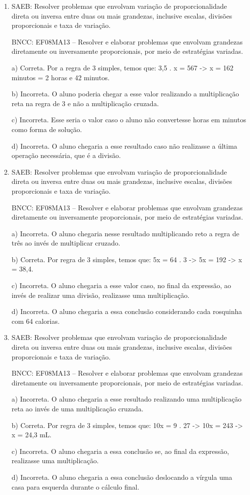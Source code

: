 \begin{enumerate}
\item SAEB: Resolver problemas que envolvam variação de proporcionalidade
direta ou inversa entre duas ou mais grandezas, inclusive escalas,
divisões proporcionais e taxa de variação.

BNCC: EF08MA13 -- Resolver e elaborar problemas que envolvam grandezas
diretamente ou inversamente proporcionais, por meio de estratégias
variadas.

a) Correta. Por a regra de 3 simples, temos que:
3,5 . x = 567 -> x = 162 minutos = 2 horas e 42 minutos.

b) Incorreta. O aluno poderia chegar a esse valor realizando a
multiplicação reta na regra de 3 e não a multiplicação cruzada.

c) Incorreta. Esse seria o valor caso o aluno não convertesse horas
em minutos como forma de solução.

d) Incorreta. O aluno chegaria a esse resultado caso não realizasse
a última operação necessária, que é a divisão.

\item SAEB: Resolver problemas que envolvam variação de proporcionalidade
direta ou inversa entre duas ou mais grandezas, inclusive escalas,
divisões proporcionais e taxa de variação.

BNCC: EF08MA13 -- Resolver e elaborar problemas que envolvam grandezas
diretamente ou inversamente proporcionais, por meio de estratégias
variadas.

a) Incorreta. O aluno chegaria nesse resultado multiplicando reto a
regra de três ao invés de multiplicar cruzado.

b) Correta. Por regra de 3 simples, temos que:
5x = 64 . 3 -> 5x = 192 -> x = 38,4.

c) Incorreta. O aluno chegaria a esse valor caso, no final da
expressão, ao invés de realizar uma divisão, realizasse uma
multiplicação.

d) Incorreta. O aluno chegaria a essa conclusão considerando cada
rosquinha com 64 calorias.
\item SAEB: Resolver problemas que envolvam variação de proporcionalidade
direta ou inversa entre duas ou mais grandezas, inclusive escalas,
divisões proporcionais e taxa de variação.

BNCC: EF08MA13 -- Resolver e elaborar problemas que envolvam grandezas
diretamente ou inversamente proporcionais, por meio de estratégias
variadas.

a) Incorreta. O aluno chegaria a esse resultado realizando uma
multiplicação reta ao invés de uma multiplicação cruzada.

b) Correta. Por regra de 3 simples, temos que:
10x = 9 . 27 -> 10x = 243 -> x = 24,3 mL.

c) Incorreta. O aluno chegaria a essa conclusão se, ao final da
expressão, realizasse uma multiplicação.

d) Incorreta. O aluno chegaria a essa conclusão deslocando a
vírgula uma casa para esquerda durante o cálculo final.
\end{enumerate}


